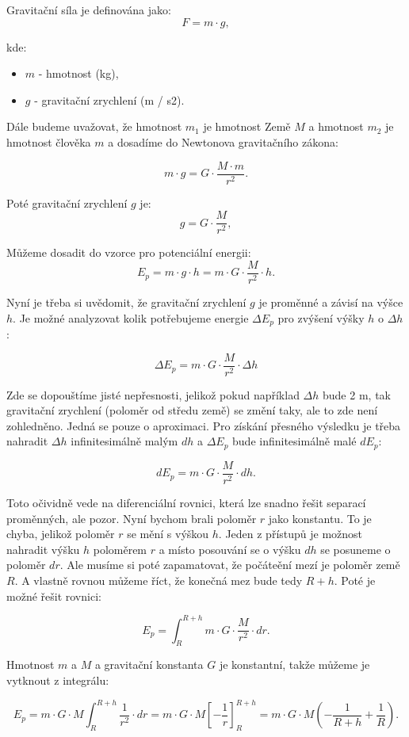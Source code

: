 \documentclass{article}
\begin{document}
Gravitační síla je definována jako:
$$
    F = m \cdot g,
$$

kde:
\begin{itemize}
    \item $m$ - hmotnost (kg),
    \item $g$ - gravitační zrychlení (m / s2).
\end{itemize}

Dále budeme uvažovat, že hmotnost $m_1$ je hmotnost Země $M$ a hmotnost $m_2$ je hmotnost člověka $m$ a dosadíme do Newtonova gravitačního zákona:

$$
    m \cdot g = G \cdot \frac{M \cdot m}{r^2}.
$$

Poté gravitační zrychlení $g$ je:
$$
    g = G \cdot \frac{M}{r^2},
$$

Můžeme dosadit do vzorce pro potenciální energii:
$$
    E_p = m \cdot g \cdot h = m \cdot G \cdot \frac{M}{r^2} \cdot h.
$$

Nyní je třeba si uvědomit, že gravitační zrychlení $g$ je proměnné a závisí na výšce $h$. Je možné analyzovat kolik potřebujeme energie $\Delta E_p$ pro zvýšení výšky $h$ o $\Delta h$:

$$
    \Delta E_p = m \cdot G \cdot \frac{M}{r^2} \cdot \Delta h
$$

Zde se dopouštíme jisté nepřesnosti, jelikož pokud například $\Delta h$ bude 2 m, tak gravitační zrychlení (poloměr od středu země) se změní taky, ale to zde není zohledněno. Jedná se pouze o aproximaci. Pro získání přesného výsledku je třeba nahradit $\Delta h$ infinitesimálně malým $dh$ a $\Delta E_p$ bude infinitesimálně malé $dE_p$:

$$
    dE_p = m \cdot G \cdot \frac{M}{r^2} \cdot dh.
$$

Toto očividně vede na diferenciální rovnici, která lze snadno řešit separací proměnných, ale pozor. Nyní bychom brali poloměr $r$ jako konstantu. To je chyba, jelikož poloměr $r$ se mění s výškou $h$. Jeden z přístupů je možnost nahradit výšku $h$ poloměrem $r$ a místo posouvání se o výšku $dh$ se posuneme o poloměr $dr$. Ale musíme si poté zapamatovat, že počáteění mezí je poloměr země $R$. A vlastně rovnou můžeme říct, že konečná mez bude tedy $R + h$. Poté je možné řešit rovnici:

$$
    E_p = \int_{R}^{R + h} m \cdot G \cdot \frac{M}{r^2} \cdot dr.
$$

Hmotnost $m$ a $M$ a gravitační konstanta $G$ je konstantní, takže můžeme je vytknout z integrálu:

$$
    E_p = m \cdot G \cdot M \int_{R}^{R + h} \frac{1}{r^2} \cdot dr = m \cdot G \cdot M \left[ - \frac{1}{r} \right]_{R}^{R + h} = m \cdot G \cdot M \left( - \frac{1}{R + h} + \frac{1}{R} \right).
$$
\end{document}
